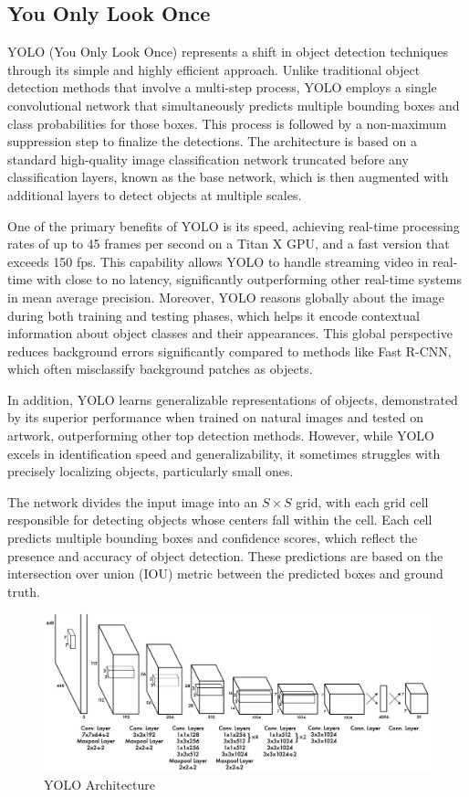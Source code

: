 \subsection{You Only Look Once}

YOLO (You Only Look Once) \cite{yolo} represents a shift in object detection techniques through its simple and highly efficient approach. Unlike traditional 
object detection methods that involve a multi-step process, YOLO employs a single convolutional network that simultaneously predicts multiple bounding boxes 
and class probabilities for those boxes. This process is followed by a non-maximum suppression step to finalize the detections. The architecture is based on a 
standard high-quality image classification network truncated before any classification layers, known as the base network, which is then augmented with additional 
layers to detect objects at multiple scales.

One of the primary benefits of YOLO is its speed, achieving real-time processing rates of up to 45 frames per second on a Titan X GPU, and a fast 
version that exceeds 150 fps. This capability allows YOLO to handle streaming video in real-time with close to no latency, significantly outperforming other 
real-time systems in mean average precision. Moreover, YOLO reasons globally about the image during both training and testing phases, which helps it encode 
contextual information about object classes and their appearances. This global perspective reduces background errors significantly compared to methods like 
Fast R-CNN, which often misclassify background patches as objects.

In addition, YOLO learns generalizable representations of objects, demonstrated by its superior performance when trained on natural images and tested on 
artwork, outperforming other top detection methods. However, while YOLO excels in identification speed and generalizability, it sometimes struggles with 
precisely localizing objects, particularly small ones. 


\newpage
The network divides the input image into an \(S \times S\) grid, with each grid cell responsible for 
detecting objects whose centers fall within the cell. Each cell predicts multiple bounding boxes and confidence scores, which reflect the presence and 
accuracy of object detection. These predictions are based on the intersection over union (IOU) metric between the predicted boxes and ground truth.

\begin{figure}[h!]
    \centering
    \includegraphics[scale=0.55]{Figures/yolo.jpg}
    \caption{YOLO Architecture \cite{yolo}}
    \label{fig:yolo}
\end{figure}


